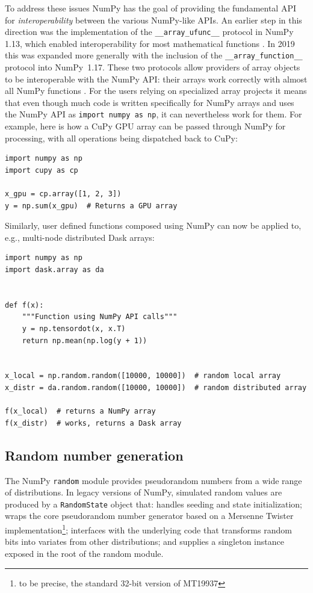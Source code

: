 To address these issues NumPy has the goal of providing the fundamental
API for \emph{interoperability} between the various NumPy-like APIs.
An earlier step in this direction was the implementation of the
\texttt{\_\_array\_ufunc\_\_} protocol in NumPy 1.13, which enabled interoperability
for most mathematical functions \cite{NEP13}.
In 2019 this was expanded more generally with the inclusion of the
\texttt{\_\_array\_function\_\_} protocol into NumPy~1.17.
These two protocols allow providers of array objects to be interoperable
with the NumPy API: their arrays work correctly with almost all NumPy functions \cite{NEP18}.
For the users relying on specialized array projects it means that even though
much code is written specifically for NumPy arrays and uses the NumPy API as
\texttt{import numpy as np}, it can nevertheless work for them.
For example, here is how a CuPy GPU array can be passed through NumPy for
processing, with all operations being dispatched back to CuPy:

\begin{lstlisting}
import numpy as np
import cupy as cp

x_gpu = cp.array([1, 2, 3])
y = np.sum(x_gpu)  # Returns a GPU array
\end{lstlisting}

Similarly, user defined functions composed using NumPy can now be
applied to, e.g., multi-node distributed Dask arrays:

\begin{lstlisting}
import numpy as np
import dask.array as da


def f(x):
    """Function using NumPy API calls"""
    y = np.tensordot(x, x.T)
    return np.mean(np.log(y + 1))


x_local = np.random.random([10000, 10000])  # random local array
x_distr = da.random.random([10000, 10000])  # random distributed array

f(x_local)  # returns a NumPy array
f(x_distr)  # works, returns a Dask array
\end{lstlisting}

\subsection*{Random number generation}

The NumPy \texttt{random} module provides pseudorandom numbers from a wide range of
distributions. In legacy versions of NumPy, simulated random values are produced
by a \texttt{RandomState} object that: handles seeding and state initialization;
wraps the core pseudorandom number generator based on a Mersenne Twister
implementation\footnote{to be precise, the standard 32-bit version of MT19937};
interfaces with the underlying code that transforms random bits into
variates from other distributions; and supplies a singleton instance exposed in
the root of the random module.


